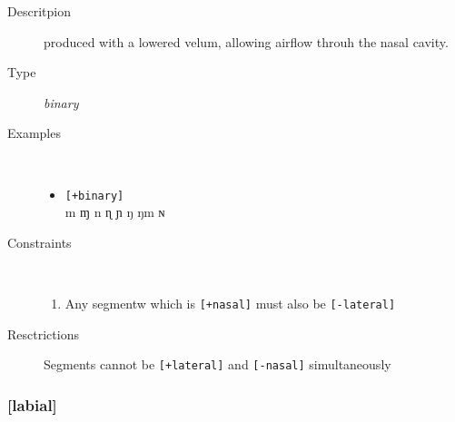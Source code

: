 \documentclass[10pt,letterpaper]{article}
\begin{document}
\begin{description}
\item[Descritpion] produced with a lowered velum, allowing airflow throuh the nasal cavity.
\item[Type] \emph{binary}
\item[Examples]\
  \begin{itemize}
    \item \texttt{[+binary]}\\
    m ɱ n ɳ ɲ ŋ ŋm ɴ 
  \end{itemize}
\item[Constraints]\
  \begin{enumerate}
    \item Any segmentw which is \texttt{[+nasal]} must also be \texttt{[-lateral]}
  \end{enumerate}
\item[Resctrictions] Segments cannot be \texttt{[+lateral]} and \texttt{[-nasal]} simultaneously
\end{description}

\subsubsection{[labial]}
\label{ssub:feature_labial}


\end{document}
